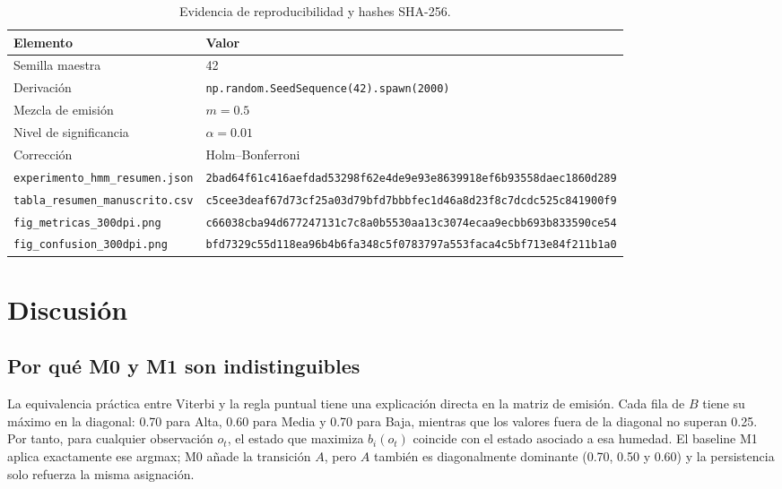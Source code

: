 \documentclass[11pt,letterpaper]{article}
\begin{document}
\begin{table}[H]
\centering
\caption{Evidencia de reproducibilidad y hashes SHA-256.}
\label{tab:repro}
\scriptsize
\begin{tabular}{@{}p{4.4cm}p{11.0cm}@{}}
\toprule
Elemento & Valor\\
\midrule
Semilla maestra & 42\\
Derivación & \texttt{np.random.SeedSequence(42).}\newline\texttt{spawn(2000)}\\
Mezcla de emisión & \(m=0.5\)\\
Nivel de significancia & \(\alpha=0.01\)\\
Corrección & Holm--Bonferroni\\
\texttt{experimento\_hmm\_resumen.json} & \texttt{2bad64f61c416aefdad53298f62e4de9}\newline\texttt{e93e8639918ef6b93558daec1860d289}\\
\texttt{tabla\_resumen\_manuscrito.csv} & \texttt{c5cee3deaf67d73cf25a03d79bfd7bbb}\newline\texttt{fec1d46a8d23f8c7dcdc525c841900f9}\\
\texttt{fig\_metricas\_300dpi.png} & \texttt{c66038cba94d677247131c7c8a0b5530}\newline\texttt{aa13c3074ecaa9ecbb693b833590ce54}\\
\texttt{fig\_confusion\_300dpi.png} & \texttt{bfd7329c55d118ea96b4b6fa348c5f07}\newline\texttt{83797a553faca4c5bf713e84f211b1a0}\\
\bottomrule
\end{tabular}
\end{table}

\section{Discusión}

\subsection{Por qué M0 y M1 son indistinguibles}

La equivalencia práctica entre Viterbi y la regla puntual tiene una explicación directa en la matriz de emisión. Cada fila de \(B\) tiene su máximo en la diagonal: 0.70 para Alta, 0.60 para Media y 0.70 para Baja, mientras que los valores fuera de la diagonal no superan 0.25. Por tanto, para cualquier observación \(o_t\), el estado que maximiza \(b_i(o_t)\) coincide con el estado asociado a esa humedad. El baseline M1 aplica exactamente ese argmax; M0 añade la transición \(A\), pero \(A\) también es diagonalmente dominante (0.70, 0.50 y 0.60) y la persistencia solo refuerza la misma asignación.
\end{document}
